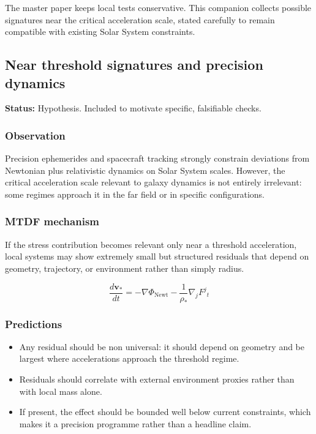 \documentclass[11pt,a4paper]{article}
\begin{document}
The master paper keeps local tests conservative. This companion collects possible signatures near the critical acceleration scale, stated carefully to remain compatible with existing Solar System constraints.

\subsection{Near threshold signatures and precision dynamics}
\begin{mdframed}[linecolor=accent,linewidth=0.5pt,backgroundcolor=callout-bg,leftline=true,rightline=true,topline=true,bottomline=true,innerleftmargin=8pt,innerrightmargin=8pt,innertopmargin=6pt,innerbottommargin=6pt]
\textbf{Status:} Hypothesis. Included to motivate specific, falsifiable checks.
\end{mdframed}

\subsubsection{Observation}
Precision ephemerides and spacecraft tracking strongly constrain deviations from Newtonian plus relativistic dynamics on Solar System scales. However, the critical acceleration scale relevant to galaxy dynamics is not entirely irrelevant: some regimes approach it in the far field or in specific configurations.

\subsubsection{MTDF mechanism}
If the stress contribution becomes relevant only near a threshold acceleration, local systems may show extremely small but structured residuals that depend on geometry, trajectory, or environment rather than simply radius.

$$
\frac{d\mathbf{v}_*}{dt} = -\nabla \Phi_{\mathrm{Newt}} - \frac{1}{\rho_*}\nabla_j F^{j}{}_{t}
$$

\subsubsection{Predictions}
\begin{itemize}
  \item Any residual should be non universal: it should depend on geometry and be largest where accelerations approach the threshold regime.
  \item Residuals should correlate with external environment proxies rather than with local mass alone.
  \item If present, the effect should be bounded well below current constraints, which makes it a precision programme rather than a headline claim.
\end{itemize}
\end{document}
